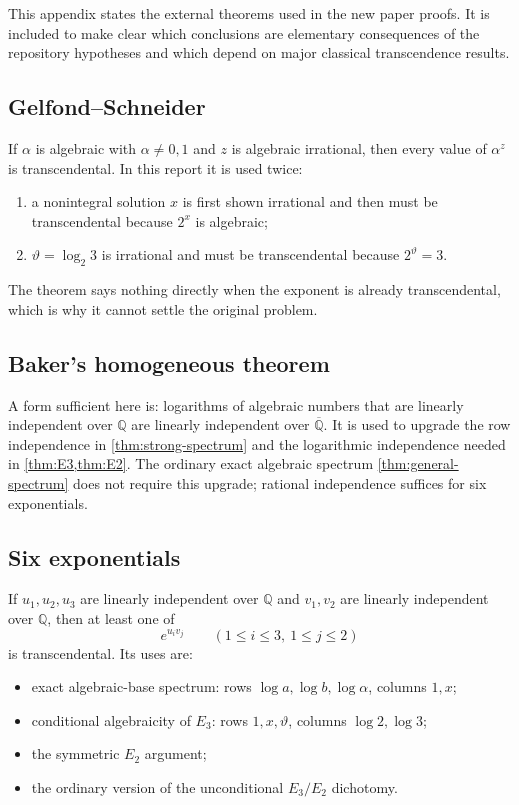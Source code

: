 \documentclass[11pt,oneside]{article}
\theoremstyle{definition}
\theoremstyle{remark}
\newcommand{\Q}{\mathbb Q}
\newcommand{\Qbar}{\overline{\mathbb Q}}
\begin{document}
This appendix states the external theorems used in the new paper proofs.  It is included to
make clear which conclusions are elementary consequences of the repository hypotheses and
which depend on major classical transcendence results.

\subsection{Gelfond--Schneider}

If $\alpha$ is algebraic with $\alpha\ne0,1$ and $z$ is algebraic irrational, then every value
of $\alpha^z$ is transcendental.  In this report it is used twice:

\begin{enumerate}
\item a nonintegral solution $x$ is first shown irrational and then must be transcendental
      because $2^x$ is algebraic;
\item $\vartheta=\log_2 3$ is irrational and must be transcendental because
      $2^{\vartheta}=3$.
\end{enumerate}

The theorem says nothing directly when the exponent is already transcendental, which is why
it cannot settle the original problem.

\subsection{Baker's homogeneous theorem}

A form sufficient here is: logarithms of algebraic numbers that are linearly independent over
$\Q$ are linearly independent over $\Qbar$.  It is used to upgrade the row independence in
\cref{thm:strong-spectrum} and the logarithmic independence needed in
\cref{thm:E3,thm:E2}.  The ordinary exact algebraic spectrum
\cref{thm:general-spectrum} does not require this upgrade; rational independence suffices for
six exponentials.

\subsection{Six exponentials}

If $u_1,u_2,u_3$ are linearly independent over $\Q$ and $v_1,v_2$ are linearly independent
over $\Q$, then at least one of
\[
  e^{u_iv_j}\qquad(1\le i\le3,\ 1\le j\le2)
\]
is transcendental.  Its uses are:

\begin{itemize}
\item exact algebraic-base spectrum: rows $\log a,\log b,\log\alpha$, columns $1,x$;
\item conditional algebraicity of $E_3$: rows $1,x,\vartheta$, columns $\log2,\log3$;
\item the symmetric $E_2$ argument;
\item the ordinary version of the unconditional $E_3/E_2$ dichotomy.
\end{itemize}
\end{document}
